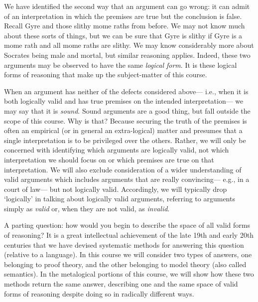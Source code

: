 We have identified the second way that an argument can go wrong: it can admit of an interpretation in which the premises are true but the conclusion is false.
Recall Gyre and those slithy mome raths from before.
We may not know much about these sorts of things, but we can be sure that Gyre is slithy if Gyre is a mome rath and all mome raths are slithy.
We may know considerably more about Socrates being male and mortal, but similar reasoning applies.
Indeed, these two arguments may be observed to have the same \textit{logical form}.
It is these logical forms of reasoning that make up the subject-matter of this course.

When an argument has neither of the defects considered above--- i.e., when it is both logically valid and has true premises on the intended interpretation--- we may say that it is \textit{sound}. %
Sound arguments are a good thing, but fall outside the scope of this course.
Why is that?
Because securing the truth of the premises is often an empirical (or in general an extra-logical) matter and presumes that a single interpretation is to be privileged over the others.
Rather, we will only be concerned with identifying which arguments are logically valid, not which interpretation we should focus on or which premises are true on that interpretation.
We will also exclude consideration of a wider understanding of valid arguments which includes arguments that are really convincing--- e.g., in a court of law--- but not logically valid.
Accordingly, we will typically drop `logically' in talking about logically valid arguments, referring to arguments simply as \textit{valid} or, when they are not valid, as \textit{invalid}.

A parting question: how would you begin to describe the space of all valid forms of reasoning? 
It is a great intellectual achievement of the late 19th and early 20th centuries that we have devised systematic methods for answering this question (relative to a language).
In this course we will consider two types of answers, one belonging to proof theory, and the other belonging to model theory (also called semantics).
In the metalogical portions of this course, we will show how these two methods return the same answer, describing one and the same space of valid forms of reasoning despite doing so in radically different ways.

